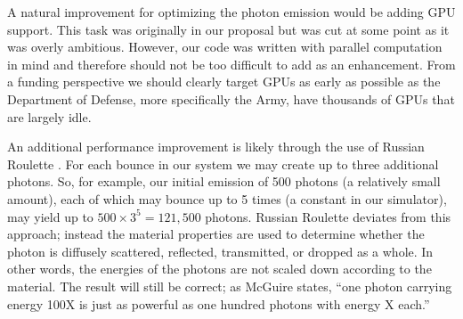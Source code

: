 \documentclass[%
        final,
        notitlepage,
        narroweqnarray,
        inline,
        twoside,
        ]{ieee}
\begin{document}
A natural improvement for optimizing the photon emission would be adding
GPU support.  This task was originally in our proposal but was cut at some
point as it was overly ambitious.  However, our code was written with
parallel computation in mind and therefore should not be too difficult to
add as an enhancement.  From a funding perspective we should clearly target
GPUs as early as possible as the Department of Defense, more specifically the
Army, have thousands of GPUs that are largely idle.

An additional performance improvement is likely through the use of
Russian Roulette \cite{Jensen96globalillumination}\cite{Russian}.  For each
bounce in our
system we may create up to three additional photons.  So, for example, our
initial emission of 500 photons (a relatively small amount), each of which may
bounce up to 5 times (a constant in our simulator), may yield up
to $500 \times 3^5 = 121,500$ photons.  Russian Roulette deviates from this
approach; instead the material properties are used to determine whether the
photon is diffusely scattered, reflected, transmitted, or dropped as a whole.
In other words, the energies of the photons are not scaled down according to
the material.  The result will still be correct; as McGuire states,
``one photon carrying energy 100X is just as powerful as one hundred photons
with energy X each.''\cite{Russian}





\end{document}
